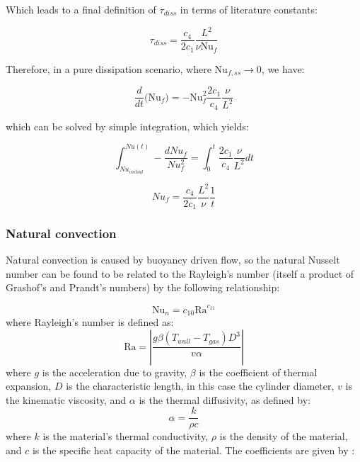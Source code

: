 \noindent Which leads to a final definition of $\tau_{diss}$ in terms of literature constants:

\begin{equation}
\tau_{diss} = \frac{c_4}{2c_1}  \frac{L^2}{\nu \text{Nu}_f}
\end{equation}

\noindent Therefore, in a pure dissipation scenario, where $\text{Nu}_{f,ss} \rightarrow 0$, we have:

\begin{equation}
\frac{d}{dt}\Big(\text{Nu}_f \Big) = -\text{Nu}_f^2  \frac{2c_1}{c_4}\frac{\nu}{L^2}
\end{equation}

\noindent which can be solved by simple integration, which yields:

\begin{equation}
\int^{Nu(t)}_{Nu_{initial}} - \frac{dNu_f}{Nu_f^2} = \int^t_0 \frac{2c_1}{c_4} \frac{\nu}{L^2} dt
\end{equation}

\begin{equation}
Nu_f = \frac{c_4}{2c_1} \frac{L^2}{\nu} \frac{1}{t}
\end{equation}


\subsubsection{Natural convection}
\label{sec:naturalConvection}

Natural convection is caused by buoyancy driven flow, so the natural Nusselt number can be found to be related to the Rayleigh's number (itself a product of Grashof's and Prandt's numbers) by the following relationship:

\begin{equation}
\text{Nu}_n  = c_{10} \text{Ra}^{c_{11}}
\end{equation}
where Rayleigh's number is defined as:
\begin{equation}
\text{Ra} = \left| \frac{g\beta\left(T_{wall} - T_{gas} \right) D^3}{v\alpha}\right|
\end{equation}
where $g$ is the acceleration due to gravity, $\beta$ is the coefficient of thermal expansion, $D$ is the characteristic length, in this case the cylinder diameter, $v$ is the kinematic viscosity, and $\alpha$ is the thermal diffusivity, as defined by:
\begin{equation}
\label{equ:thermalDiffusivity}
\alpha = \frac{k}{\rho c}
\end{equation}
where $k$ is the material's thermal conductivity, $\rho$ is the density of the material, and $c$ is the specific heat capacity of the material. The coefficients are given by :

